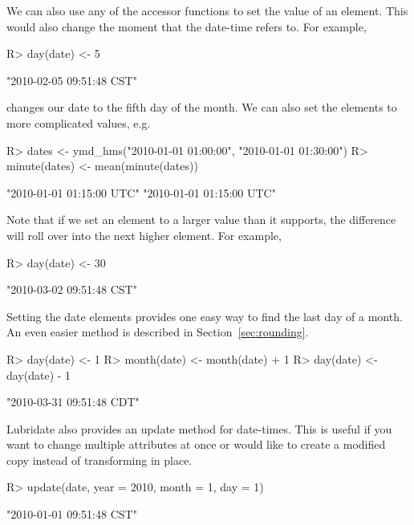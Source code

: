 \documentclass[article]{jss}
\begin{document}
We can also use any of the accessor functions to set the value of an element. This would also change the moment that the date-time refers to. For example,

\begin{CodeInput}
R> day(date) <- 5
\end{CodeInput}
\begin{CodeOutput}
[1] "2010-02-05 09:51:48 CST"
\end{CodeOutput}

changes our date to the fifth day of the month. We can also set the elements to more complicated values, e.g.

\begin{CodeInput}
R> dates <- ymd_hms("2010-01-01 01:00:00", "2010-01-01 01:30:00")
R> minute(dates) <- mean(minute(dates))
\end{CodeInput}
\begin{CodeOutput}
[1] "2010-01-01 01:15:00 UTC" "2010-01-01 01:15:00 UTC"
\end{CodeOutput}

Note that if we set an element to a larger value than it supports, the difference will roll over into the next higher element. For example,

\begin{CodeInput}
R> day(date) <- 30
\end{CodeInput}
\begin{CodeOutput}
[1] "2010-03-02 09:51:48 CST"
\end{CodeOutput}

Setting the date elements provides one easy way to find the last day of a month. An even easier method is described in Section~\ref{sec:rounding}.

\begin{CodeInput}
R> day(date) <- 1
R> month(date) <- month(date) + 1
R> day(date) <- day(date) - 1
\end{CodeInput}
\begin{CodeOutput}
[1] "2010-03-31 09:51:48 CDT"
\end{CodeOutput}

Lubridate also provides an update method for date-times.  This is useful if you want to change multiple attributes at once or would like to create a modified copy instead of transforming in place.

\begin{CodeInput}
R> update(date, year = 2010, month = 1, day = 1)
\end{CodeInput}
\begin{CodeOutput}
[1] "2010-01-01 09:51:48 CST"
\end{CodeOutput}
\end{document}
